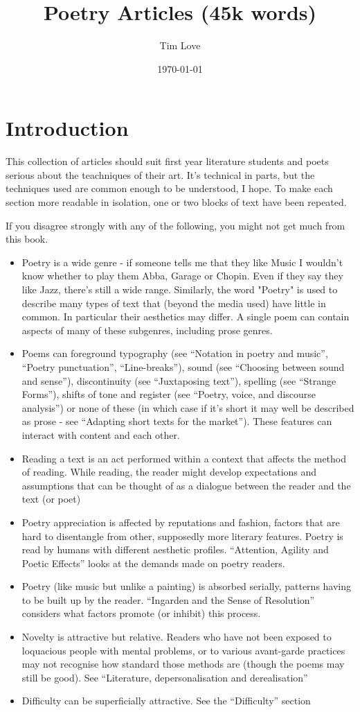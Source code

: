 \documentclass[11pt]{article}
\begin{document}
\title{Poetry Articles (45k words)}
\author{Tim Love}
\date{\today}

\section{Introduction}
This collection of articles should suit first year literature students and poets serious about the teachniques of their art. It's technical in parts, but the techniques used are common enough to be understood, I hope. To make each section more readable in isolation, one or two blocks of text have been repeated.

If you disagree strongly with any of the following, you might not get much from this book.
\begin{itemize}

\item    Poetry is a wide genre - if someone tells me that they like Music I wouldn't know whether to play them Abba, Garage or Chopin. Even if they say they like Jazz, there's still a wide range. Similarly, the word "Poetry" is used to describe many types of text that (beyond the media used) have little in common. In particular their aesthetics may differ. A single poem can contain aspects of many of these subgenres, including prose genres.
\item      Poems can foreground typography (see ``Notation in poetry and music'', ``Poetry punctuation'', ``Line-breaks''), sound (see ``Choosing between sound and sense''), discontinuity (see ``Juxtaposing text''), spelling (see ``Strange Forms''), shifts of tone and register (see ``Poetry, voice, and discourse analysis'') or none of these (in which case if it's short it may well be described as prose - see ``Adapting short texts for the market''). These features can interact with content and each other.
\item Reading a text is an act performed within a context that affects the method of reading. While reading, the reader might develop expectations and assumptions that can be thought of as a dialogue between the reader and the text (or poet)  
\item Poetry appreciation is affected by reputations and fashion, factors that are hard to disentangle from other, supposedly more literary features. Poetry is read by humans with different aesthetic profiles. ``Attention, Agility and Poetic Effects'' looks at the demands made on poetry readers.
\item      Poetry (like music but unlike a painting) is absorbed serially, patterns having to be built up by the reader. ``Ingarden and the Sense of Resolution'' considers what factors promote (or inhibit) this process.
 \item     Novelty is attractive but relative. Readers who have not been exposed to loquacious people with mental problems, or to various avant-garde practices may not recognise how standard those methods are (though the poems may still be good). See ``Literature, depersonalisation and derealisation''
 \item     Difficulty can be superficially attractive. See the ``Difficulty'' section



\end{itemize}
\end{document}
